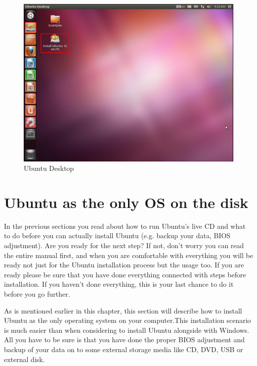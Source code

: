 \begin{figure}[h!]	
	\begin{center}
	\includegraphics[width=400pt]{./images/installation/install-live1.png}
	\caption{Ubuntu Desktop}	
	\label{fig:live-desktop}	
	\end{center}
\end{figure}

\newpage
\section{Ubuntu as the only OS on the disk} \label{sect:ubuntu-install}
In the previous sections you read about how to run Ubuntu's live CD and what to do before you can actually install Ubuntu (e.g. backup your data, BIOS adjustment). Are you ready for the next step? If not, don't worry you can read the entire manual first, and when you are comfortable with everything you will be ready not just for the Ubuntu installation process but the usage too. If you are ready please be sure that you have done everything connected with steps before installation. If you haven't done everything, this is your last chance to do it before you go further. \\

\par \noindent As is mentioned earlier in this chapter, this section will describe how to install Ubuntu as the only operating system on your computer.This installation scenario is much easier than when considering to install Ubuntu alongside with Windows. All you have to be sure is that you have done the proper BIOS adjustment and backup of your data on to some external storage media like CD, DVD, USB or external disk.  \\


